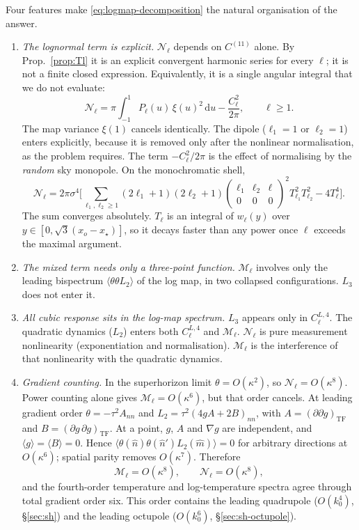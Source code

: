 \documentclass[11pt]{article}
\theoremstyle{definition}
\theoremstyle{remark}
\newcommand{\nh}{\hat n}
\newcommand{\dd}{\mathrm{d}}
\newcommand{\ens}[1]{\langle #1\rangle}
\newcommand{\TF}{\operatorname{TF}}
\begin{document}
Four features make \eqref{eq:logmap-decomposition} the natural organisation of the answer.
\begin{enumerate}
\item \emph{The lognormal term is explicit.} $\mathcal N_\ell$ depends on $C^{(11)}$
  alone. By Prop.~\ref{prop:Tl} it is an explicit convergent harmonic series for every
  $\ell$; it is not a finite closed expression. Equivalently, it is a single angular integral
  that we do not evaluate:
  \begin{equation}\label{eq:lognormal-legendre}
  \mathcal N_\ell=\pi\int_{-1}^{1}P_\ell(u)\,\xi(u)^2\,\dd u-\frac{C_\ell^2}{2\pi},\qquad\ell\ge1 .
  \end{equation}
  The map variance
  $\xi(1)$ cancels identically. The dipole ($\ell_1=1$ or $\ell_2=1$) enters explicitly,
  because it is removed only after the nonlinear normalisation, as the problem requires. The
  term $-C_\ell^2/2\pi$ is the effect of normalising by the \emph{random} sky monopole. On the
  monochromatic shell,
  \begin{equation}\label{eq:lognormal-shell}
  \boxed{\displaystyle
  \mathcal N_\ell=2\pi\sigma^4\Big[\sum_{\ell_1,\ell_2\ge1}(2\ell_1+1)(2\ell_2+1)
  \begin{pmatrix}\ell_1&\ell_2&\ell\\0&0&0\end{pmatrix}^{\!2}
  T_{\ell_1}^2T_{\ell_2}^2-4T_\ell^4\Big].}
  \end{equation}
  The sum converges absolutely. $T_{\ell}$ is an integral of $w_\ell(y)$ over
  $y\in[0,\sqrt3(x_o-x_\star)]$, so it decays faster than any power once $\ell$ exceeds the
  maximal argument.
\item \emph{The mixed term needs only a three-point function.} $\mathcal M_\ell$ involves only
  the leading bispectrum $\ens{\theta\theta L_2}$ of the log map, in two collapsed
  configurations. $L_3$ does not enter it.
\item \emph{All cubic response sits in the log-map spectrum.} $L_3$ appears only in
  $C^{L,4}_\ell$. The quadratic dynamics ($L_2$) enters both $C^{L,4}_\ell$ and
  $\mathcal M_\ell$. $\mathcal N_\ell$ is pure measurement nonlinearity (exponentiation and
  normalisation). $\mathcal M_\ell$ is the interference of that nonlinearity with the quadratic
  dynamics.
\item \emph{Gradient counting.} In the superhorizon limit $\theta=O(\kappa^2)$, so
  $\mathcal N_\ell=O(\kappa^8)$. Power counting alone gives $\mathcal M_\ell=O(\kappa^6)$, but
  that order cancels. At leading gradient order $\theta=-\tau^2A_{nn}$ and
  $L_2=\tau^2(4gA+2B)_{nn}$, with $A=(\partial\partial g)_{\TF}$ and
  $B=(\partial g\,\partial g)_{\TF}$. At a point, $g$, $A$ and $\nabla g$ are independent,
  and $\ens g=\ens B=0$. Hence $\ens{\theta(\nh)\theta(\nh')L_2(\hat m)}=0$ for arbitrary
  directions at $O(\kappa^6)$; spatial parity removes $O(\kappa^7)$. Therefore
  \[
  \mathcal M_\ell=O(\kappa^8),\qquad\mathcal N_\ell=O(\kappa^8),
  \]
  and the fourth-order temperature and log-temperature spectra agree through total gradient
  order six. This order contains the leading quadrupole ($O(k_0^4)$, \S\ref{sec:sh}) and the
  leading octupole ($O(k_0^6)$, \S\ref{sec:sh-octupole}).
\end{enumerate}
\end{document}
